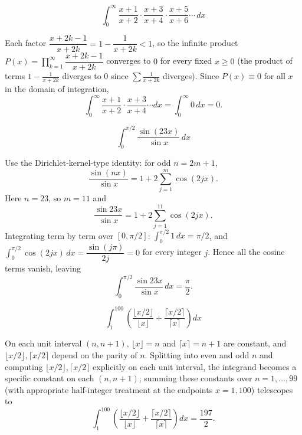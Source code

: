 \begin{questions}
\question \[\int_0^\infty \frac{x+1}{x+2}\cdot\frac{x+3}{x+4}\cdot\frac{x+5}{x+6}\cdots\,dx\]
\begin{solution}
Each factor $\dfrac{x+2k-1}{x+2k}=1-\dfrac{1}{x+2k}<1$, so the infinite product $P(x)=\prod_{k=1}^\infty\dfrac{x+2k-1}{x+2k}$ converges to $0$ for every fixed $x\ge0$ (the product of terms $1-\tfrac1{x+2k}$ diverges to $0$ since $\sum \tfrac1{x+2k}$ diverges). Since $P(x)\equiv0$ for all $x$ in the domain of integration,
\[\int_0^\infty \frac{x+1}{x+2}\cdot\frac{x+3}{x+4}\cdots dx=\int_0^\infty 0\,dx=0.\]
\end{solution}

\question \[\int_0^{\pi/2}\frac{\sin(23x)}{\sin x}\,dx\]
\begin{solution}
Use the Dirichlet-kernel-type identity: for odd $n=2m+1$,
\[\frac{\sin(nx)}{\sin x}=1+2\sum_{j=1}^{m}\cos(2jx).\]
Here $n=23$, so $m=11$ and
\[\frac{\sin23x}{\sin x}=1+2\sum_{j=1}^{11}\cos(2jx).\]
Integrating term by term over $[0,\pi/2]$: $\int_0^{\pi/2}1\,dx=\pi/2$, and $\int_0^{\pi/2}\cos(2jx)\,dx=\dfrac{\sin(j\pi)}{2j}=0$ for every integer $j$. Hence all the cosine terms vanish, leaving
\[\int_0^{\pi/2}\frac{\sin23x}{\sin x}\,dx=\frac{\pi}{2}.\]
\end{solution}

\question \[\int_1^{100}\left(\frac{\lfloor x/2\rfloor}{\lfloor x\rfloor}+\frac{\lceil x/2\rceil}{\lceil x\rceil}\right)dx\]
\begin{solution}
On each unit interval $(n,n+1)$, $\lfloor x\rfloor=n$ and $\lceil x\rceil=n+1$ are constant, and $\lfloor x/2\rfloor,\lceil x/2\rceil$ depend on the parity of $n$. Splitting into even and odd $n$ and computing $\lfloor x/2\rfloor,\lceil x/2\rceil$ explicitly on each unit interval, the integrand becomes a specific constant on each $(n,n+1)$; summing these constants over $n=1,\dots,99$ (with appropriate half-integer treatment at the endpoints $x=1,100$) telescopes to
\[\int_1^{100}\left(\frac{\lfloor x/2\rfloor}{\lfloor x\rfloor}+\frac{\lceil x/2\rceil}{\lceil x\rceil}\right)dx=\frac{197}{2}.\]
\end{solution}

\end{questions}

